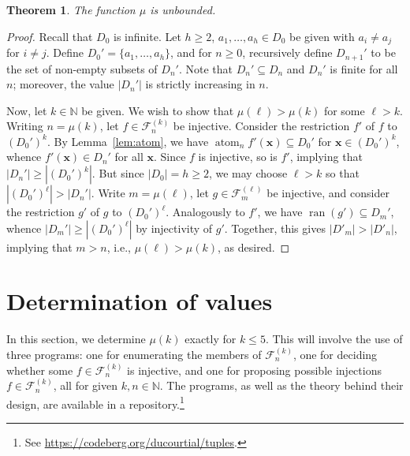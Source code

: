 \documentclass[a4paper,12pt]{article}
\newtheorem{theorem}{Theorem}[section]
\theoremstyle{definition}
\theoremstyle{remark}
\newcommand{\fset}[2]{\mathcal F^{(#1)}_{#2}}
\newcommand{\N}{\mathbb N}
\DeclareMathOperator{\atom}{atom}
\DeclareMathOperator{\ran}{ran}
\begin{document}
\begin{theorem}\label{thm:unb}
    The function $\mu$ is unbounded.
\end{theorem}
\begin{proof}
    Recall that $D_0$ is infinite. Let $h \geq 2$, $a_1, \dots, a_h \in D_0$ be given with $a_i \neq a_j$ for $i \neq j$. Define $D_0' = \{a_1, \dots, a_h\}$, and for $n \geq 0$, recursively define $D_{n+1}'$ to be the set of non-empty subsets of $D_n'$. Note that $D_n' \subseteq D_n$ and $D_n'$ is finite for all $n$; moreover, the value $|D_n'|$ is strictly increasing in $n$.

    Now, let $k \in \N$ be given. We wish to show that $\mu(\ell) > \mu(k)$ for some $\ell > k$. Writing $n = \mu(k)$, let $f \in \fset kn$ be injective. Consider the restriction $f'$ of $f$ to $(D_0')^k$. By Lemma~\ref{lem:atom}, we have $\atom_n f'(\mathbf x) \subseteq D_0'$ for $\mathbf x \in (D_0')^k$, whence $f'(\mathbf x) \in D_n'$ for all $\mathbf x$. Since $f$ is injective, so is $f'$, implying that $|D_n'| \geq |(D_0')^k|$. But since $|D_0| = h \geq 2$, we may choose $\ell > k$ so that $|(D_0')^\ell| > |D_n'|$. Write $m = \mu(\ell)$, let $g \in \fset \ell m$ be injective, and consider the restriction $g'$ of $g$ to $(D_0')^\ell$. Analogously to $f'$, we have $\ran(g') \subseteq D_m'$, whence $|D_m'| \geq |(D_0')^\ell|$ by injectivity of $g'$. Together, this gives $|D'_m| > |D'_n|$, implying that $m > n$, i.e., $\mu(\ell) > \mu(k)$, as desired.
\end{proof}

\section{Determination of values}\label{sec:val}

In this section, we determine $\mu(k)$ exactly for $k \leq 5$. This will involve the use of three programs: one for enumerating the members of $\fset kn$, one for deciding whether some $f \in \fset kn$ is injective, and one for proposing possible injections $f \in \fset kn$, all for given $k, n \in \N$. The programs, as well as the theory behind their design, are available in a repository.\footnote{See \url{https://codeberg.org/ducourtial/tuples}.\label{fn}}
\end{document}

